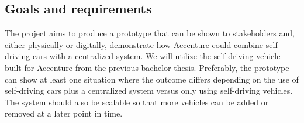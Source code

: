 \subsection{Goals and requirements}
The project aims to produce a prototype that can be shown to stakeholders and, either physically or digitally, demonstrate how Accenture could combine self-driving cars with a centralized system. We will utilize the self-driving vehicle built for Accenture from the previous bachelor thesis. Preferably, the prototype can show at least one situation where the outcome differs depending on the use of self-driving cars plus a centralized system versus only using self-driving vehicles. The system should also be scalable so that more vehicles can be added or removed at a later point in time. 
